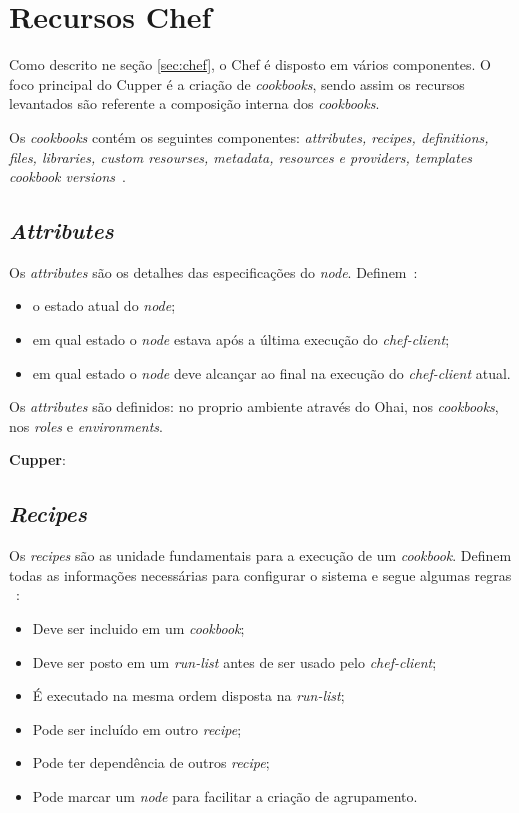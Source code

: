 \section{Recursos Chef}
\label{sec:lev-rec}

Como descrito ne seção \ref{sec:chef}, o Chef é disposto em vários
componentes. O foco principal do Cupper é a criação de \textit{cookbooks},
sendo assim os recursos levantados são referente a composição interna
dos \textit{cookbooks}.

Os \textit{cookbooks} contém os seguintes componentes: \textit{attributes, recipes, definitions,
files, libraries, custom resourses, metadata, resources e providers, templates
cookbook versions}~\cite{chefdoc:2016}.

\subsection{\textit{Attributes}}
\label{sec:lev-rec-att}

Os \textit{attributes} são os detalhes das especificações do \textit{node}. Definem~\cite{chefdoc:2016}:

\begin{itemize}
  \item o estado atual do \textit{node};
  \item em qual estado o \textit{node} estava após a última execução do \textit{chef-client};
  \item em qual estado o \textit{node} deve alcançar ao final na execução do \textit{chef-client} atual.
\end{itemize}

Os \textit{attributes} são definidos: no proprio ambiente através do Ohai, nos \textit{cookbooks},
nos \textit{roles} e \textit{environments}.

\textbf{Cupper}:

\subsection{\textit{Recipes}}
\label{sec:lev-rec-rec}

Os \textit{recipes} são as unidade fundamentais para a execução de um \textit{cookbook}. Definem
todas as informações necessárias para configurar o sistema e segue algumas regras
~\cite{chefdoc:2016}:

\begin{itemize}
  \item Deve ser incluido em um \textit{cookbook};
  \item Deve ser posto em um \textit{run-list} antes de ser usado pelo \textit{chef-client};
  \item É executado na mesma ordem disposta na \textit{run-list};
  \item Pode ser incluído em outro \textit{recipe};
  \item Pode ter dependência de outros \textit{recipe};
  \item Pode marcar um \textit{node} para facilitar a criação de agrupamento.
\end{itemize}


